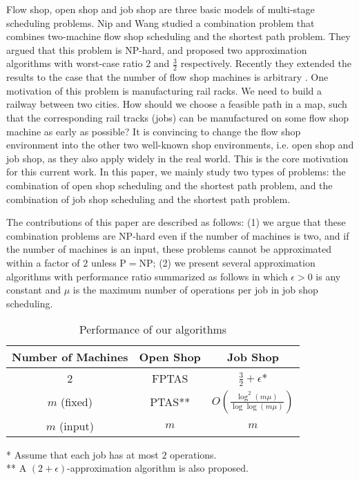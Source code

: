 \documentclass{llncs}
\numberwithin{subcase}{case}
\begin{document}
Flow shop, open shop and job shop are three basic models of multi-stage scheduling problems. Nip and Wang \cite{NW13} studied a combination problem that combines two-machine flow shop scheduling and the shortest path problem. They argued that this problem is $\mathrm{NP}$-hard, and proposed two approximation algorithms with worst-case ratio $2$ and $\frac{3}{2}$ respectively. Recently they extended the results to the case that the number of flow shop machines is arbitrary \cite{NW13_2}. One motivation of this problem is manufacturing rail racks. We need to build a railway between two cities. How should we choose a feasible path in a map, such that the corresponding rail tracks (jobs) can be manufactured on some flow shop machine as early as possible? It is convincing to change the flow shop environment into the other two well-known shop environments, i.e. open shop and job shop, as they also apply widely in the real world. This is the core motivation for this current work. In this paper, we mainly study two types of problems: the combination of open shop scheduling and the shortest path problem, and the combination of job shop scheduling and the shortest path problem.

The contributions of this paper are described as follows:
(1) we argue that these combination problems are $\mathrm{NP}$-hard even if the number of machines is two, and if the number of machines is an input, these problems cannot be approximated within a factor of $2$ unless $\mathrm{P}=\mathrm{NP}$; (2) we present several approximation algorithms with performance ratio summarized as follows in which $\epsilon > 0$ is any constant and $\mu$ is the maximum number of operations per job in job shop scheduling.
\begin{table}[h]\label{tab1}
\begin{center}
\begin{tabular}{|c|c|c|}
                  \hline
Number of Machines & Open Shop & Job Shop\\
                  \hline
                  2 & FPTAS & $\frac{3}{2}+\epsilon$* \\
                  $m$ (fixed) & PTAS** & $O\left(\frac{\log^2(m\mu)}{\log{\log(m\mu)}}\right)$\\
                  $m$ (input) &  $m$ &  $m$\\
                  \hline
\end{tabular}
\caption{Performance of our algorithms}
\end{center}
* Assume that each job has at most $2$ operations.\\
** A $(2+\epsilon)$-approximation algorithm is also proposed.
\end{table}
\end{document}
